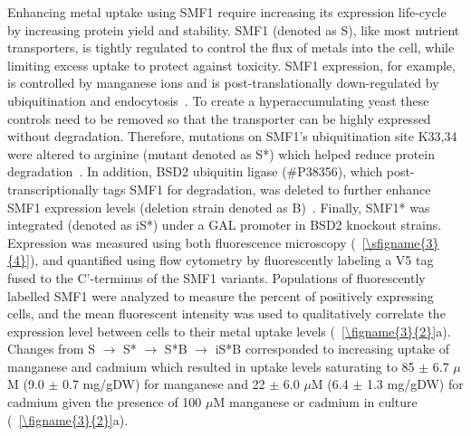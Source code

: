 \documentclass[../main/main]{subfiles}
\begin{document}
Enhancing metal uptake using SMF1 require increasing its expression life-cycle by increasing protein yield and stability. SMF1 (denoted as S), like most nutrient transporters, is tightly regulated to control the flux of metals into the cell, while limiting excess uptake to protect against toxicity. SMF1 expression, for example, is controlled by manganese ions and is post-translationally down-regulated by ubiquitination and endocytosis~\cite{nikko2008}. To create a hyperaccumulating yeast these controls need to be removed so that the transporter can be highly expressed without degradation. Therefore, mutations on SMF1's ubiquitination site K33,34 were altered to arginine (mutant denoted as S*) which helped reduce protein degradation~\cite{nikko2008}. In addition, BSD2 ubiquitin ligase (\#{}P38356), which post-transcriptionally tags SMF1 for degradation, was deleted to further enhance SMF1 expression levels (deletion strain denoted as B)~\cite{liu1997,liu1999}. Finally, SMF1* was integrated (denoted as iS*) under a GAL promoter in BSD2 knockout strains. Expression was measured using both fluorescence microscopy (\sFIGURE~\ref{\sfigname{3}{4}}), and quantified using flow cytometry by fluorescently labeling a V5 tag fused to the C'-terminus of the SMF1 variants. Populations of fluorescently labelled SMF1 were analyzed to measure the percent of positively expressing cells, and the mean fluorescent intensity was used to qualitatively correlate the expression level between cells to their metal uptake levels (\FIGURE~\ref{\figname{3}{2}}a). Changes from
S $\rightarrow$ S* $\rightarrow$ S*B $\rightarrow$ iS*B
corresponded to increasing uptake of manganese and cadmium which resulted in uptake levels saturating to 85 $\pm$ 6.7 $\mu$M (9.0 $\pm$ 0.7 mg/gDW) for manganese and 22 $\pm$ 6.0 $\mu$M (6.4 $\pm$ 1.3 mg/gDW) for cadmium given the presence of 100 $\mu$M manganese or cadmium in culture (\FIGURE~\ref{\figname{3}{2}}a).

\end{document}
